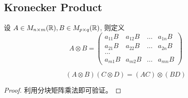 \documentclass[11pt,fleqn]{book} %
\def\R{\mathbb{R}}
\begin{document}
\begin{CJK}{UTF8}{gkai}
\section{Kronecker Product}
\begin{definition}
    设 $A \in M_{n \x m }(\R), B \in M_{p \x q}(\R)$, 则定义
    \[
        A \otimes B = 
        \begin{pmatrix}
            a_{11}B & a_{12}B & ... & a_{1n}B \\
            a_{21}B & a_{22}B & ... & a_{2n}B \\
            ... \\
            a_{m1}B & a_{m2}B & ... & a_{mn}B 
        \end{pmatrix}\]
\end{definition}
\begin{property}
    [混合乘积] \[
        (A\otimes B)(C \otimes D) = (AC) \otimes (BD)\]
\end{property}
\begin{proof}
    利用分块矩阵乘法即可验证。
\end{proof}

\end{CJK}
\end{document}

